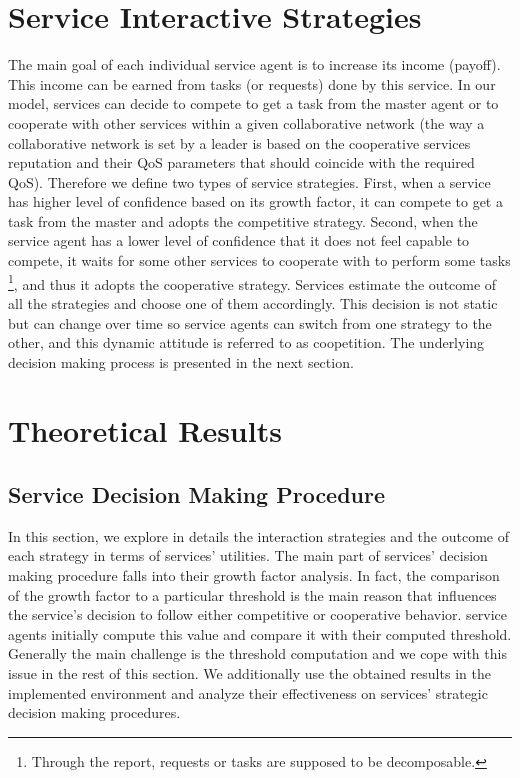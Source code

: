 \section{Service Interactive Strategies}

The main goal of each individual service agent is to increase its
income (payoff). This income can be earned from tasks (or
requests) done by this service. In our model, services can decide
to compete to get a task from the master agent or to cooperate
with other services within a given collaborative network (the way
a collaborative network is set by a leader is based on the
cooperative services reputation and their QoS parameters that
should coincide with the required QoS). Therefore we define two
types of service strategies. First, when a service has higher
level of confidence based on its growth factor, it can compete to
get a task from the master and adopts the competitive strategy.
Second, when the service agent has a lower level of confidence
that it does not feel capable to compete, it waits for some other
services to cooperate with to perform some tasks \footnote{Through
the report, requests or tasks are supposed to be decomposable.},
and thus it adopts the cooperative strategy. Services estimate the
outcome of all the strategies and choose one of them accordingly.
This decision is not static but can change over time so service
agents can switch from one strategy to the other, and this dynamic
attitude is referred to as coopetition. The underlying decision
making process is presented in the next section.


\section{Theoretical Results}\label{Theoretical Results}

\subsection{Service Decision Making Procedure}
In this section, we explore in details the interaction strategies
and the outcome of each strategy in terms of services' utilities.
The main part of services' decision making procedure falls into
their growth factor analysis. In fact, the comparison of the
growth factor to a particular threshold is the main reason that
influences the service's decision to follow either competitive or
cooperative behavior. service agents initially compute this value
and compare it with their computed threshold. Generally the main
challenge is the threshold computation and we cope with this issue
in the rest of this section. We additionally use the obtained
results in the implemented environment and analyze their
effectiveness on services' strategic decision making procedures.


